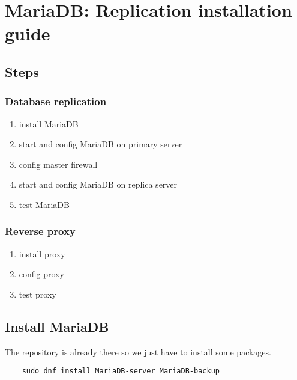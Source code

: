 
\section{MariaDB: Replication installation guide}

\subsection{Steps}

\subsubsection{Database replication}

\begin{enumerate}
    \item install MariaDB
    \item start and config MariaDB on primary server
    \item config master firewall
    \item start and config MariaDB on replica server
    \item test MariaDB
\end{enumerate}

\subsubsection{Reverse proxy}

\begin{enumerate}
    \item install proxy
    \item config proxy
    \item test proxy
\end{enumerate}

\subsection{Install MariaDB}

The repository is already there so we just have to install some packages.

\begin{lstlisting}
    sudo dnf install MariaDB-server MariaDB-backup
\end{lstlisting}

